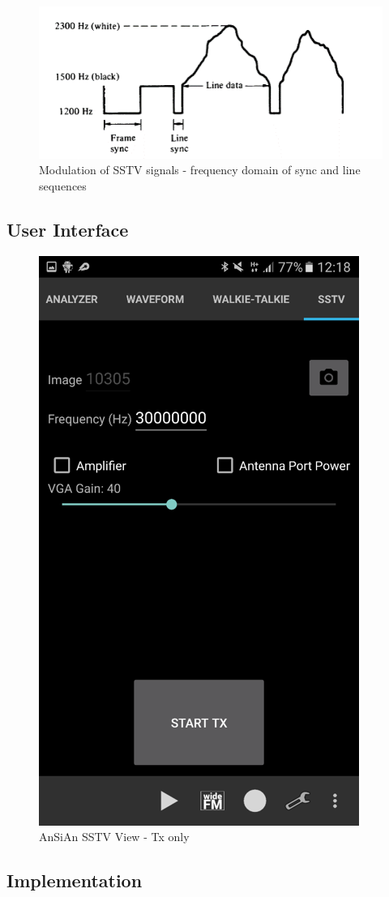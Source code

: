\begin{figure}
	\centering
	\includegraphics[width=\linewidth]{gfx/sstv_intro.png}
	\caption{Modulation of \ac{SSTV}  signals - frequency domain of sync and line sequences \cite[p. 239]{pritchard2016newnes}}
	\label{fig:impl:sstv:intro}
\end{figure}

\subsection{User Interface}

\begin{figure}
	\centering
	\includegraphics[width=0.4\linewidth]{gfx/screenshot_gui_sstv.png}
	\caption{AnSiAn \ac{SSTV} View - Tx only}
	\label{fig:impl:sstv:gui}
\end{figure}

\subsection{Implementation}
